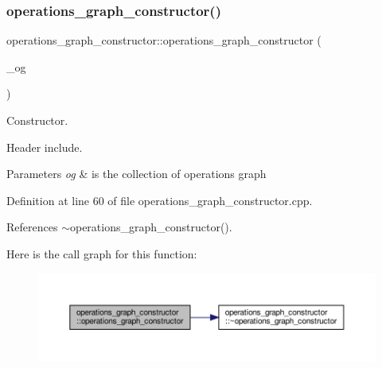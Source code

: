 \subsubsection{\texorpdfstring{operations\+\_\+graph\+\_\+constructor()}{operations\_graph\_constructor()}}
{\footnotesize\ttfamily operations\+\_\+graph\+\_\+constructor\+::operations\+\_\+graph\+\_\+constructor (\begin{DoxyParamCaption}\item[{\hyperlink{op__graph_8hpp_a6a9918dc96f448814ad35759f9460ed7}{Op\+Graphs\+Collection\+Ref}}]{\+\_\+og }\end{DoxyParamCaption})\hspace{0.3cm}{\ttfamily [explicit]}}



Constructor. 

Header include.


\begin{DoxyParams}{Parameters}
{\em og} & is the collection of operations graph \\
\hline
\end{DoxyParams}


Definition at line 60 of file operations\+\_\+graph\+\_\+constructor.\+cpp.



References $\sim$operations\+\_\+graph\+\_\+constructor().

Here is the call graph for this function\+:
\nopagebreak
\begin{figure}[H]
\begin{center}
\leavevmode
\includegraphics[width=350pt]{d7/d2f/classoperations__graph__constructor_a3158fc69235da451a4a7397302d12f82_cgraph}
\end{center}
\end{figure}
\mbox{\label{classoperations__graph__constructor_ae35d11d539285615f193316d83316211}} 
